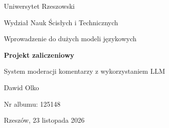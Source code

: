 \begin{titlepage}
  \centering
  \vspace*{3cm}
  {\large Uniwersytet Rzeszowski\par}
  \vspace{0.2cm}
  {\large Wydział Nauk Ścisłych i Technicznych\par}
  \vspace{0.5cm}
  {\large Wprowadzenie do dużych modeli językowych\par}
  \vspace{2.5cm}
  {\LARGE\bfseries Projekt zaliczeniowy\par}
  \vspace{0.6cm}
  {\Large System moderacji komentarzy z wykorzystaniem LLM\par}
  \vspace{3cm}
  {\large Dawid Olko\par}
  \vspace{0.2cm}
  {\large Nr albumu: 125148\par}
  \vfill
  {\large Rzeszów, 23 listopada 2026\par}
\end{titlepage}
